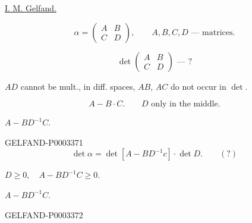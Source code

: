 \uline{I. M. Gelfand.}

\begin{equation*}\alpha=\begin{pmatrix}A&B\\C&D\end{pmatrix},\qquad A, B, C, D\text{ --- matrices.}\end{equation*}

\begin{equation*}\det\begin{pmatrix}A&B\\C&D\end{pmatrix}\text{ --- ?}\end{equation*}

$AD$ cannot be mult., in diff. spaces, $AB$, $AC$ do not occur in $\det$.

\begin{equation*}A-B\cdot C.\qquad\text{$D$ only in the middle.}\end{equation*}

$A-BD^{-1}C$.

\begin{GelfandAdjacentEvidence}{GELFAND-P000337}{1}
\begin{equation*}\det\alpha=\det[A-BD^{-1}c]\cdot\det D.\qquad (?)\end{equation*}

\end{GelfandAdjacentEvidence}


 $D\geq0,\quad A-BD^{-1}C\geq0$.

$A-BD^{-1}C$.

\begin{GelfandAdjacentEvidence}{GELFAND-P000337}{2}
 

\end{GelfandAdjacentEvidence}


